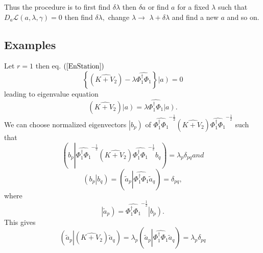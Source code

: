 \documentclass[aps,preprint]{revtex4}%
\begin{document}
Thus the procedure is to first find $\delta\lambda$ then $\delta a$ or find
$a$ for a fixed $\lambda$ such that $D_{a}\mathcal{L}\left(  a,\lambda
,\gamma\right)  =0$ then find $\delta\lambda,$ change $\lambda\rightarrow$
$\lambda+\delta\lambda$ and find a new $a$ and so on.

\subsection{Examples}

Let $r=1$ then eq. $\left(  \ref{EnStation}\right)  $
\begin{equation}
\left\{  \left(  \widehat{K+V_{2}}\right)  -\lambda\widehat{\Phi_{1}^{\dagger
}\Phi_{1}}\right\}  \left\vert \overset{}{a}\right)  =0
\end{equation}
leading to eigenvalue equation
\begin{equation}
\left(  \widehat{K+V_{2}}\right)  \left\vert \overset{}{a}\right)
=\lambda\widehat{\Phi_{1}^{\dagger}\Phi_{1}}\left\vert \overset{}{a}\right)  .
\label{e1}%
\end{equation}
We can choose normalized eigenvectors $\left\vert b_{p}\right)  $ of
$\widehat{\Phi_{1}^{\dagger}\Phi_{1}}^{-\frac{1}{2}}\left(  \widehat{K+V_{2}%
}\right)  \widehat{\Phi_{1}^{\dagger}\Phi_{1}}^{-\frac{1}{2}}$ such that
\begin{subequations}
\begin{equation}
\left(  b_{p}\left\vert \widehat{\Phi_{1}^{\dagger}\Phi_{1}}^{-\frac{1}{2}%
}\left(  \widehat{K+V_{2}}\right)  \widehat{\Phi_{1}^{\dagger}\Phi_{1}%
}^{-\frac{1}{2}}b_{q}\right.  \right)  =\lambda_{p}\delta_{pq}%
\end{equation}
and
\end{subequations}
\begin{equation}
\left(  b_{p}\left\vert b_{q}\right.  \right)  =\left(  \tilde{a}%
_{p}\left\vert \widehat{\Phi_{1}^{\dagger}\Phi_{1}}\tilde{a}_{q}\right.
\right)  =\delta_{pq},
\end{equation}
where
\begin{equation}
\left\vert \overset{}{\tilde{a}_{p}}\right)  =\widehat{\Phi_{1}^{\dagger}%
\Phi_{1}}^{-\frac{1}{2}}\left\vert \overset{}{b_{p}}\right)  .
\end{equation}
This gives
\begin{equation}
\left(  \tilde{a}_{p}\left\vert \left(  \widehat{K+V_{2}}\right)  \tilde
{a}_{q}\right.  \right)  =\lambda_{p}\left(  \tilde{a}_{p}\left\vert
\widehat{\Phi_{1}^{\dagger}\Phi_{1}}\tilde{a}_{q}\right.  \right)
=\lambda_{p}\delta_{pq}%
\end{equation}
\end{document}
